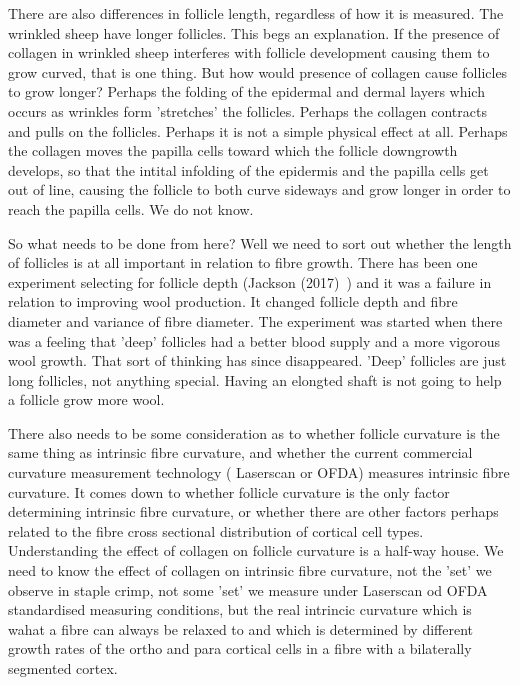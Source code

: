 \documentclass[titlepage]{article}  %
\begin{document}
There are also differences in follicle length, regardless of how it is measured. The wrinkled sheep have longer follicles. This begs an explanation. If the presence of collagen in wrinkled sheep interferes with follicle development causing them to grow curved, that is one thing. But how would presence of collagen cause follicles to grow longer? Perhaps the folding of the epidermal and dermal layers which occurs as wrinkles form 'stretches' the follicles. Perhaps the collagen contracts and pulls on the follicles. Perhaps it is not a simple physical effect at all. Perhaps the collagen moves the papilla cells toward which the follicle downgrowth develops, so that the intital infolding of the epidermis and the papilla cells get out of line, causing the follicle to both curve sideways and grow longer in order to reach the papilla cells. We do not know.

So what needs to be done from here? Well we need to sort out whether the length of follicles is at all important in relation to fibre growth. There has been one experiment selecting for follicle depth (Jackson (2017)~\cite{jack:17a}) and it was a failure in relation to improving wool production.  It changed follicle depth and fibre diameter and variance of fibre diameter. The experiment was started when there was a feeling that 'deep' follicles had a better blood supply and a more vigorous wool growth. That sort of thinking has since disappeared. 'Deep' follicles are just long follicles, not anything special. Having an elongted shaft is not going to help a follicle grow more wool.

There also needs to be some consideration as to whether follicle curvature is the same thing as intrinsic fibre curvature, and whether the current commercial curvature measurement technology ( Laserscan or OFDA) measures intrinsic fibre curvature. It comes down to whether follicle curvature is the only factor determining intrinsic fibre curvature, or whether there are other  factors perhaps related to the fibre cross sectional distribution of cortical cell types. Understanding the effect of collagen on follicle curvature is a half-way house. We need to know the effect of collagen on intrinsic fibre curvature, not the 'set' we observe in staple crimp, not some 'set' we measure under Laserscan od OFDA standardised measuring conditions, but the real intrincic curvature which is wahat a fibre can always be relaxed to and which is determined by different growth rates of the ortho and para cortical cells in a fibre with a bilaterally segmented cortex.
\end{document}
